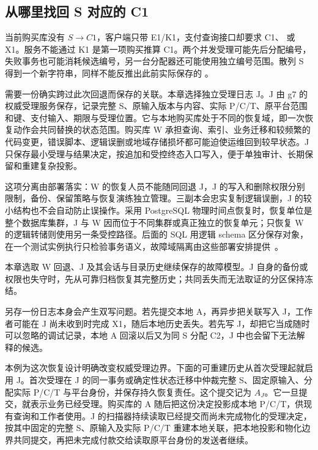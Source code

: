 \subsection*{从哪里找回 S 对应的 C1}

当前购买库没有 $S\to C1$，客户端只带 E1/K1，支付查询接口却要求 C1、 或 X1。服务不能通过 K1 是第一项购买推算 C1。两个并发受理可能先后分配编号，失败事务也可能消耗候选编号，另一台分配器还可能使用独立编号范围。散列 S 得到一个新字符串，同样不能反推出此前实际保存的 。

需要一份确实跨过此次回退而保存的关联。本章选择独立受理日志 J。J 由 g7 的权威受理服务保存，记录完整 S、原输入版本与内容、实际 P/C/T、原平台范围和键、支付输入、期限与受理位置。它与本地购买库处于不同的恢复域，即一次恢复动作会共同替换的状态范围。购买库 W 承担查询、索引、业务迁移和较频繁的代码变更，错误脚本、逻辑误删或地域存储损坏都可能迫使运维回到较早状态。J 只保存最小受理与结果决定，按追加和受控终态入口写入，便于单独审计、长期保留和重建复杂投影。

这项分离由部署落实：W 的恢复人员不能随同回退 J，J 的写入和删除权限分别限制，备份、保留策略与恢复演练独立管理。三副本会忠实复制逻辑误删，J 的较小结构也不会自动防止误操作。采用 PostgreSQL 物理时间点恢复时，恢复单位是整个数据库集群，J 与 W 因而位于不同集群或真正独立的恢复单元；只恢复 W 的逻辑转储则使用另一条受控路径。后面的 SQL 用逻辑 schema 区分保存对象，在一个测试实例执行只检验事务语义，故障域隔离由这些部署安排提供~\cite{pg18-recovery}。

本章选取 W 回退、J 及其会话与目录历史继续保存的故障模型。J 自身的备份或权限也失守时，先从可靠归档恢复其完整历史；共同丢失而无法取证的分区保持冻结。

另存一份日志本身会产生双写问题。若先提交本地 A，再异步把关联写入 J，工作者可能在 J 尚未收到时完成 X1，随后本地历史丢失。若先写 J，却把它当成随时可以忽略的调试记录，本地 A 回滚以后又为同 S 分配 C2，J 中也会留下无法解释的候选。


本例为这次恢复设计明确改变权威受理边界。下面的可重建历史从首次受理起就启用 J。首次受理在 J 的同一事务或确定性状态迁移中仲裁完整 S、固定原输入、分配实际 P/C/T 与平台身份，并保存持久恢复责任。这个提交记为 $A_J$。它一旦提交，就表示业务已经受理。购买库的 A 随后把这份决定投影成本地 P/C/T，供现有查询和工作者使用。J 的扫描器持续读取已经提交而尚未完成物化的受理决定，按其中固定的完整 S、原输入及实际 P/C/T 重建本地关联，把本地投影和物化边界共同提交，再把未完成付款交给读取原平台身份的发送者继续。

